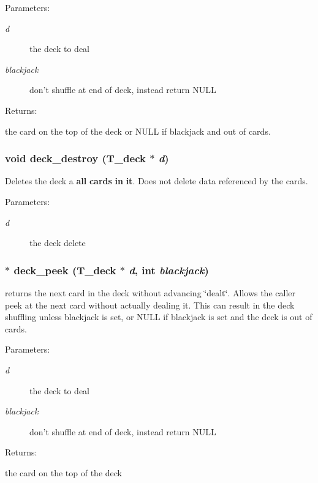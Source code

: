 \begin{Desc}
\item[Parameters: ]\par
\begin{description}
\item[{\em 
d}]the deck to deal \item[{\em 
blackjack}]don't shuffle at end of deck, instead return NULL \end{description}
\end{Desc}
\begin{Desc}
\item[Returns: ]\par
the card on the top of the deck or NULL if blackjack and out of cards. \end{Desc}
\subsubsection{\setlength{\rightskip}{0pt plus 5cm}void deck\_\-destroy ({\bf T\_\-deck} $\ast$ {\em d})}\label{group__deck_a1}


Deletes the deck a {\bf all} {\bf cards} {\bf in} {\bf it}. Does not delete data referenced by the cards.

\begin{Desc}
\item[Parameters: ]\par
\begin{description}
\item[{\em 
d}]the deck delete \end{description}
\end{Desc}
\subsubsection{$\ast$ deck\_\-peek ({\bf T\_\-deck} $\ast$ {\em d}, int {\em blackjack})}\label{group__deck_a4}


returns the next card in the deck without advancing \char`\"{}dealt\char`\"{}. Allows the caller peek at the next card without actually dealing it. This can result in the deck shuffling unless blackjack is set, or NULL if blackjack is set and the deck is out of cards.

\begin{Desc}
\item[Parameters: ]\par
\begin{description}
\item[{\em 
d}]the deck to deal \item[{\em 
blackjack}]don't shuffle at end of deck, instead return NULL \end{description}
\end{Desc}
\begin{Desc}
\item[Returns: ]\par
the card on the top of the deck \end{Desc}
